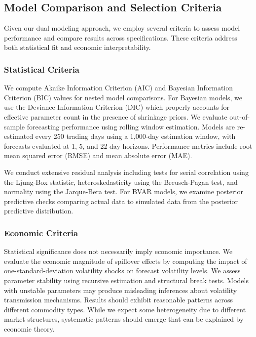 \subsection{Model Comparison and Selection Criteria}

Given our dual modeling approach, we employ several criteria to assess model performance and compare results across specifications. These criteria address both statistical fit and economic interpretability.

\subsubsection{Statistical Criteria}

We compute Akaike Information Criterion (AIC) and Bayesian Information Criterion (BIC) values for nested model comparisons. For Bayesian models, we use the Deviance Information Criterion (DIC) which properly accounts for effective parameter count in the presence of shrinkage priors. We evaluate out-of-sample forecasting performance using rolling window estimation. Models are re-estimated every 250 trading days using a 1,000-day estimation window, with forecasts evaluated at 1, 5, and 22-day horizons. Performance metrics include root mean squared error (RMSE) and mean absolute error (MAE).

We conduct extensive residual analysis including tests for serial correlation using the Ljung-Box statistic, heteroskedasticity using the Breusch-Pagan test, and normality using the Jarque-Bera test. For BVAR models, we examine posterior predictive checks comparing actual data to simulated data from the posterior predictive distribution.

\subsubsection{Economic Criteria}

Statistical significance does not necessarily imply economic importance. We evaluate the economic magnitude of spillover effects by computing the impact of one-standard-deviation volatility shocks on forecast volatility levels. We assess parameter stability using recursive estimation and structural break tests. Models with unstable parameters may produce misleading inferences about volatility transmission mechanisms. Results should exhibit reasonable patterns across different commodity types. While we expect some heterogeneity due to different market structures, systematic patterns should emerge that can be explained by economic theory.


